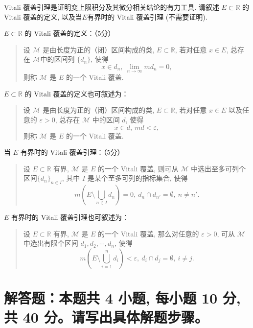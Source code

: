 \begin{question}[points = 10]
  Vitali 覆盖引理是证明变上限积分及其微分相关结论的有力工具. 请叙述 $E\subset \mathbb{R}$ 的 Vitali 覆盖的定义, 以及当$E$有界时的 Vitali 覆盖引理 (不需要证明).
\end{question}

\begin{solution}
  \(E\subset \mathbb{R}\) 的 Vitali 覆盖的定义：（5分）

  \begin{quote}
  设 \(\mathscr{M}\) 是由长度为正的（闭）区间构成的类, \(E \subset \mathbb{R}\), 若对任意 \(x \in E\), 总存在 \(\mathscr{M}\)中的区间列 \(\{d_n\}\), 使得
  \[x \in d_n, ~ \lim\limits_{n\to\infty} m d_n = 0,\]
  则称 \(\mathscr{M}\) 是 \(E\) 的一个 Vitali 覆盖.
  \end{quote}

  \(E\subset \mathbb{R}\) 的 Vitali 覆盖的定义也可叙述为：

  \begin{quote}
  设 \(\mathscr{M}\) 是由长度为正的（闭）区间构成的类, \(E \subset \mathbb{R}\), 若对任意 \(x \in E\) 以及任意的 \(\varepsilon > 0\), 总存在 \(\mathscr{M}\) 中的区间 \(d\), 使得
  \[x \in d, ~ m d < \varepsilon,\]
  则称 \(\mathscr{M}\) 是 \(E\) 的一个 Vitali 覆盖.
  \end{quote}

  当 \(E\) 有界时的 Vitali 覆盖引理：（5分）

  \begin{quote}
  设 \(E \subset \mathbb{R}\) 有界, \(\mathscr{M}\) 是 \(E\) 的一个 Vitali 覆盖, 则可从 \(\mathscr{M}\) 中选出至多可列个区间\(\{d_n\}_{n \in I}\), 其中 \(I\) 是某个至多可列的指标集合, 使得
  \[m \left( E \setminus \bigcup\limits_{n \in I} d_n \right) = 0, ~ d_n \cap d_{n'} = \emptyset, ~ n \neq n'.\]
  \end{quote}

  \(E\) 有界时的 Vitali 覆盖引理也可叙述为：

  \begin{quote}
  设 \(E \subset \mathbb{R}\) 有界, \(\mathscr{M}\) 是 \(E\) 的一个 Vitali 覆盖, 那么对任意的 \(\varepsilon > 0\), 可从 \(\mathscr{M}\) 中选出有限个区间 \(d_1, d_2, \cdots, d_n\), 使得
  \[m \left( E \setminus \bigcup\limits_{i=1}^n d_i \right) < \varepsilon, ~ d_i \cap d_j = \emptyset, ~ i \neq j.\]
  \end{quote}
\end{solution}


\section{解答题：本题共 4 小题, 每小题 10 分, 共 40 分。请写出具体解题步骤。}

